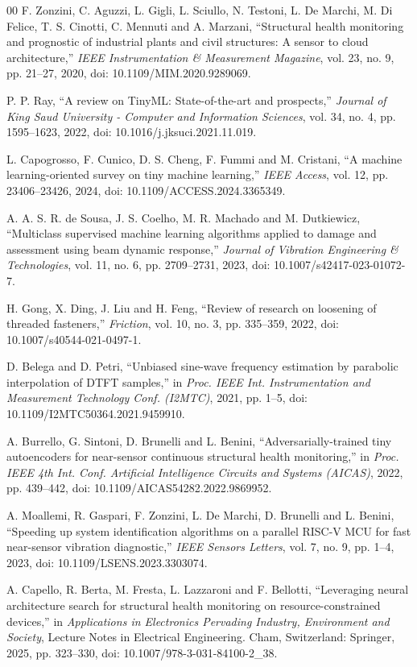 \documentclass[conference]{IEEEtran}
\begin{document}
\begin{thebibliography}{00}
 F. Zonzini, C. Aguzzi, L. Gigli, L. Sciullo, N. Testoni, L. De Marchi, M. Di Felice, T. S. Cinotti, C. Mennuti and A. Marzani, ``Structural health monitoring and prognostic of industrial plants and civil structures: A sensor to cloud architecture,'' \emph{IEEE Instrumentation \& Measurement Magazine}, vol. 23, no. 9, pp. 21--27, 2020, doi: 10.1109/MIM.2020.9289069.

 P. P. Ray, ``A review on TinyML: State-of-the-art and prospects,'' \emph{Journal of King Saud University - Computer and Information Sciences}, vol. 34, no. 4, pp. 1595--1623, 2022, doi: 10.1016/j.jksuci.2021.11.019.

 L. Capogrosso, F. Cunico, D. S. Cheng, F. Fummi and M. Cristani, ``A machine learning-oriented survey on tiny machine learning,'' \emph{IEEE Access}, vol. 12, pp. 23406--23426, 2024, doi: 10.1109/ACCESS.2024.3365349.

 A. A. S. R. de Sousa, J. S. Coelho, M. R. Machado and M. Dutkiewicz, ``Multiclass supervised machine learning algorithms applied to damage and assessment using beam dynamic response,'' \emph{Journal of Vibration Engineering \& Technologies}, vol. 11, no. 6, pp. 2709--2731, 2023, doi: 10.1007/s42417-023-01072-7.

 H. Gong, X. Ding, J. Liu and H. Feng, ``Review of research on loosening of threaded fasteners,'' \emph{Friction}, vol. 10, no. 3, pp. 335--359, 2022, doi: 10.1007/s40544-021-0497-1.

 D. Belega and D. Petri, ``Unbiased sine-wave frequency estimation by parabolic interpolation of DTFT samples,'' in \emph{Proc. IEEE Int. Instrumentation and Measurement Technology Conf. (I2MTC)}, 2021, pp. 1--5, doi: 10.1109/I2MTC50364.2021.9459910.

 A. Burrello, G. Sintoni, D. Brunelli and L. Benini, ``Adversarially-trained tiny autoencoders for near-sensor continuous structural health monitoring,'' in \emph{Proc. IEEE 4th Int. Conf. Artificial Intelligence Circuits and Systems (AICAS)}, 2022, pp. 439--442, doi: 10.1109/AICAS54282.2022.9869952.

 A. Moallemi, R. Gaspari, F. Zonzini, L. De Marchi, D. Brunelli and L. Benini, ``Speeding up system identification algorithms on a parallel RISC-V MCU for fast near-sensor vibration diagnostic,'' \emph{IEEE Sensors Letters}, vol. 7, no. 9, pp. 1--4, 2023, doi: 10.1109/LSENS.2023.3303074.

 A. Capello, R. Berta, M. Fresta, L. Lazzaroni and F. Bellotti, ``Leveraging neural architecture search for structural health monitoring on resource-constrained devices,'' in \emph{Applications in Electronics Pervading Industry, Environment and Society}, Lecture Notes in Electrical Engineering. Cham, Switzerland: Springer, 2025, pp. 323--330, doi: 10.1007/978-3-031-84100-2\_38.
\end{thebibliography}
\end{document}
